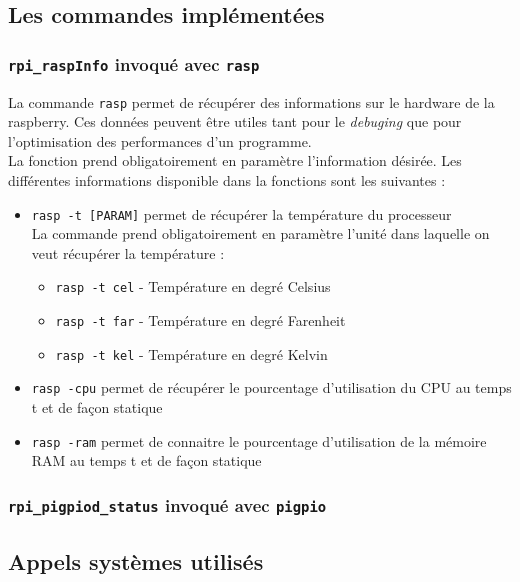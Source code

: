 \documentclass[10pt,a4paper]{article}
\begin{document}
\subsection{Les commandes implémentées}
\subsubsection{\texttt{rpi\_raspInfo} invoqué avec \texttt{rasp}}
La commande \texttt{rasp} permet de récupérer des informations sur le hardware de la raspberry. Ces données peuvent être utiles tant pour le \textit{debuging} que pour l'optimisation des performances d'un programme.\\

La fonction prend obligatoirement en paramètre l'information désirée. Les différentes informations disponible dans la fonctions sont les suivantes :

\begin{itemize}
\item \texttt{rasp -t [PARAM]} permet de récupérer la température du processeur\\

La commande prend obligatoirement en paramètre l'unité dans laquelle on veut récupérer la température : 
\begin{itemize}
\item \texttt{rasp -t cel} - Température en degré Celsius
\item \texttt{rasp -t far} - Température en degré Farenheit
\item \texttt{rasp -t kel} - Température en degré Kelvin
\end{itemize}

\item \texttt{rasp -cpu} permet de récupérer le pourcentage d'utilisation du CPU au temps t et de façon statique

\item \texttt{rasp -ram} permet de connaitre le pourcentage d'utilisation de la mémoire RAM au temps t et de façon statique
\end{itemize}

\subsubsection{\texttt{rpi\_pigpiod\_status} invoqué avec \texttt{pigpio}}

\subsection{Appels systèmes utilisés}
\end{document}
